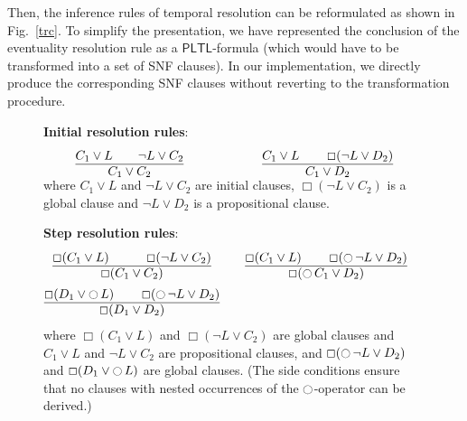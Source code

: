 \documentclass[11pt]{article}
\newcommand{\pltl}{\ml{PLTL}\xspace}
\newcommand{\Negate}[0]{{\neg}}
\newcommand{\Next}[0]{\mathop{\ocircle}}
\newcommand{\Always}[0]{\mathop{\Box}}
\newcommand{\ml}[1]{\ensuremath{\mathsf{#1}}}
\begin{document}
Then, the inference rules of temporal resolution can be reformulated as
shown in Fig.~\ref{trc}.
To simplify the presentation, we have represented the conclusion of the
eventuality resolution rule as a \pltl-formula (which would have to be
transformed into a set of SNF clauses). In our implementation, we
directly produce the corresponding SNF clauses without reverting to
the transformation procedure. 
\begin{figure}[htb]
\textbf{Initial resolution rules}:
$$
\begin{array}[t]{@{}c@{\qquad}c@{}}
\begin{array}[t]{@{}c@{}}
C_1\lor L\qquad \Negate{L}\lor C_2\\
\hline
C_1\lor C_2
\end{array}
\hphantom{\Box()\Box()\Next\:}
&
\begin{array}[t]{@{}c@{}}
C_1\lor L\qquad \Always(\Negate{L}\lor D_2)\\
\hline
C_1\lor D_2
\end{array}\\[-2ex]
\end{array}
$$
where $C_1\lor L$ and $\Negate{L}\lor C_2$ are initial
clauses, $\Always(\Negate{L}\lor C_2)$ is a global clause 
and $\Negate{L}\lor D_2$ is a propositional clause.\vspace*{1.5ex}

\textbf{Step resolution rules}:
$$
\begin{array}[t]{@{}c@{\qquad}c@{\qquad}c@{}}
\begin{array}[t]{@{}c@{}}
\Always(C_1\lor L)\qquad\hphantom{\Next}\Always(\Negate{L}\lor C_2)\\
\hline
\Always(C_1\lor C_2)
\end{array}
&
\begin{array}[t]{@{}c@{}}
\Always(C_1\lor L)\qquad\Always(\Next{\Negate{L}}\lor D_2)\\
\hline
\Always(\Next C_1\lor D_2)
\end{array}
\\[4ex]
\begin{array}[t]{@{}c@{}}
\Always(D_1\lor\Next{L})\qquad\Always(\Next{\Negate{L}}\lor D_2)\\
\hline
\Always(D_1\lor D_2)
\end{array}
\end{array}
$$
where $\Always(C_1\lor L)$ and 
$\Always(\Negate{L}\lor C_2)$ are global clauses
and $C_1\lor L$ and $\Negate{L}\lor C_2$ are propositional
clauses, and
$\Always(\Next\Negate{L}\lor D_2)$ and
$\Always(D_1\lor\Next L)$ are global clauses. (The side conditions
ensure that no clauses with nested occurrences of the $\Next$-operator
can be derived.)\vspace*{1.5ex}


\end{figure}
\end{document}
